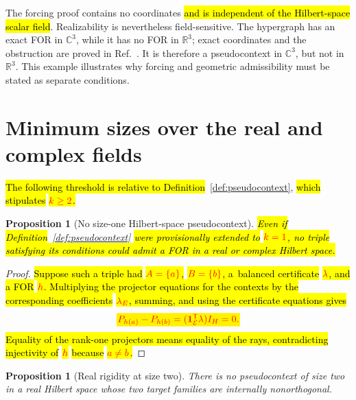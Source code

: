 \documentclass[
  twocolumn,
  aps,
  pra,
  floatfix,
  amsmath,amssymb,
  longbibliography
]{revtex4-2}
\newtheorem{proposition}[theorem]{Proposition}
\theoremstyle{definition}
\theoremstyle{remark}
\newcommand{\R}{\mathbb R}
\newcommand{\C}{\mathbb C}
\newcommand{\E}{\mathcal E}
\newcommand{\one}{\mathbf 1}
\newcommand{\corr}[1]{{\color{red}\hl{#1}}}
\newcommand{\corrmath}[1]{\begingroup\setlength{\fboxsep}{1pt}\colorbox{yellow}{\ensuremath{\color{red}#1}}\endgroup}
\begin{document}
The forcing proof contains no coordinates \corr{and is independent of the
Hilbert-space scalar field}.  Realizability
is nevertheless field-sensitive.  The hypergraph has an exact FOR in
$\C^3$, while it has no FOR in
$\R^3$; exact coordinates and the obstruction are proved in
Ref.~\cite{2026-Navara-Svozil-complex-only-3d-hypergraphs}.  It is therefore a
pseudocontext in $\C^3$, but not in $\R^3$.  This example illustrates why
forcing and geometric admissibility must be stated as separate conditions.

\section{Minimum sizes over the real and complex fields}
\label{sec:minimal}

\corr{The following threshold is relative to Definition}~\ref{def:pseudocontext},
\corr{which stipulates} \corrmath{k\ge2}\corr{.}

\begin{proposition}[No size-one Hilbert-space pseudocontext]
\label{prop:no-k1}
\corr{Even if Definition}~\ref{def:pseudocontext} \corr{were provisionally
extended to} \corrmath{k=1}\corr{, no triple satisfying its conditions could admit a
FOR in a real or complex Hilbert space.}
\end{proposition}

\begin{proof}
\corr{Suppose such a triple had} \corrmath{A=\{a\}}\corr{,}
\corrmath{B=\{b\}}\corr{, a~balanced certificate} \corrmath{\lambda}\corr{,
and a FOR} \corrmath{h}\corr{.  Multiplying the projector equations for the
contexts by the corresponding coefficients} \corrmath{\lambda_E}\corr{,
summing, and using the certificate equations gives}
\[
 \corrmath{P_{h(a)}-P_{h(b)}
 = (\one_\E^{\mathsf T}\lambda)I_H=0.}
\]
\corr{Equality of the rank-one projectors means equality of the rays,
contradicting injectivity of} \corrmath{h} \corr{because} \corrmath{a\ne b}\corr{.}
\end{proof}

\begin{proposition}[Real rigidity at size two]
\label{prop:real-k2}
There is no pseudocontext of size two in a real Hilbert space whose two target
families are internally nonorthogonal.
\end{proposition}
\end{document}
